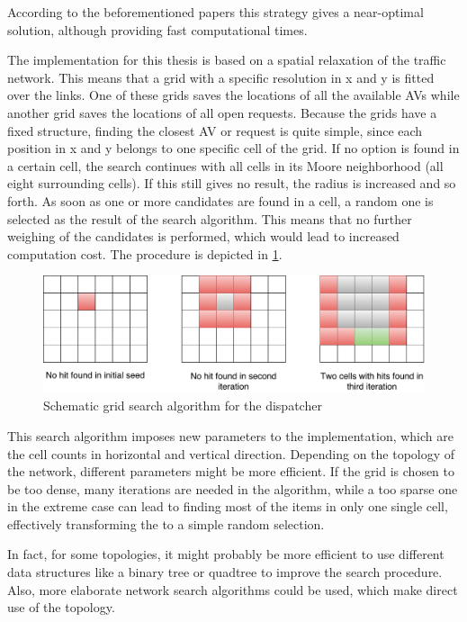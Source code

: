 According to the beforementioned papers this strategy gives a near-optimal solution,
although providing fast computational times.

The implementation for this thesis is based on a spatial relaxation of the traffic
network. This means that a grid with a specific resolution in x and y is fitted
over the links. One of these grids saves the locations of all the available AVs
while another grid saves the locations of all open requests. Because the grids have
a fixed structure, finding the closest AV or request is quite simple, since each
position in x and y belongs to one specific cell of the grid. If no option is found
in a certain cell, the search continues with all cells in its Moore neighborhood
(all eight surrounding cells). If this still gives no result, the radius is increased
and so forth. As soon as one or more candidates are found in a cell, a random one is
selected as the result of the search algorithm. This means that no further weighing
of the candidates is performed, which would lead to increased computation cost.
The procedure is depicted in \cref{fig:gridsearch}.

\begin{figure}
    \centering
    \includegraphics[width=1.0\textwidth]{figures/gridsearch.pdf}
    \caption{Schematic grid search algorithm for the dispatcher}
    \label{fig:gridsearch}
\end{figure}

This search algorithm imposes new parameters to the implementation, which
are the cell counts in horizontal and vertical direction. Depending on the topology
of the network, different parameters might be more efficient. If the grid is chosen
to be too dense, many iterations are needed in the algorithm, while a too sparse one
in the extreme case can lead to finding most of the items in only one single cell, effectively
transforming the to a simple random selection.

In fact, for some topologies, it might probably be more efficient to use different
data structures like a binary tree or quadtree to improve the search procedure.
Also, more elaborate network search algorithms could be used, which make direct use
of the topology.

